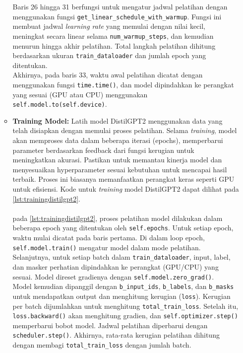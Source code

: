 \begin{enumerate}[topsep=0pt]
\begin{itemize}
      Baris 26 hingga 31 berfungsi untuk mengatur jadwal pelatihan dengan menggunakan fungsi \texttt{get\_linear\_schedule\_with\_warmup}. Fungsi ini membuat jadwal \emph{learning rate} yang memulai dengan nilai kecil, meningkat secara linear selama \texttt{num\_warmup\_steps}, dan kemudian menurun hingga akhir pelatihan. Total langkah pelatihan dihitung berdasarkan ukuran \texttt{train\_dataloader} dan jumlah epoch yang ditentukan.
      \\

      Akhirnya, pada baris 33, waktu awal pelatihan dicatat dengan menggunakan fungsi \texttt{time.time()}, dan model dipindahkan ke perangkat yang sesuai (GPU atau CPU) menggunakan \texttt{self.model.to(self.device)}.
      \\

      \item \textbf{Training Model:} Latih model DistilGPT2 menggunakan data yang telah disiapkan dengan memulai proses pelatihan. Selama \emph{training}, model akan memproses data dalam beberapa iterasi (epochs), memperbarui parameter berdasarkan feedback dari fungsi kerugian untuk meningkatkan akurasi. Pastikan untuk memantau kinerja model dan menyesuaikan hyperparameter sesuai kebutuhan untuk mencapai hasil terbaik. Proses ini biasanya memanfaatkan perangkat keras seperti GPU untuk efisiensi. Kode untuk \emph{training} model DistilGPT2 dapat dilihat pada \ref{lst:trainingdistilgpt2}.
      \\
      \\
      

      
      

      pada \ref{lst:trainingdistilgpt2}, proses pelatihan model dilakukan dalam beberapa epoch yang ditentukan oleh \texttt{self.epochs}. Untuk setiap epoch, waktu mulai dicatat pada baris pertama.
      Di dalam loop epoch, \texttt{self.model.train()} mengatur model dalam mode pelatihan. Selanjutnya, untuk setiap batch dalam \texttt{train\_dataloader}, input, label, dan masker perhatian dipindahkan ke perangkat (GPU/CPU) yang sesuai. Model direset gradienya dengan \texttt{self.model.zero\_grad()}.
      \\

      Model kemudian dipanggil dengan \texttt{b\_input\_ids}, \texttt{b\_labels}, dan \texttt{b\_masks} untuk mendapatkan output dan menghitung kerugian (\texttt{loss}). Kerugian per batch dijumlahkan untuk menghitung \texttt{total\_train\_loss}. Setelah itu, \texttt{loss.backward()} akan menghitung gradien, dan \texttt{self.optimizer.step()} memperbarui bobot model. Jadwal pelatihan diperbarui dengan \texttt{scheduler.step()}.
      Akhirnya, rata-rata kerugian pelatihan dihitung dengan membagi \texttt{total\_train\_loss} dengan jumlah batch.
      \\
      \\


\end{itemize}
\end{enumerate}
